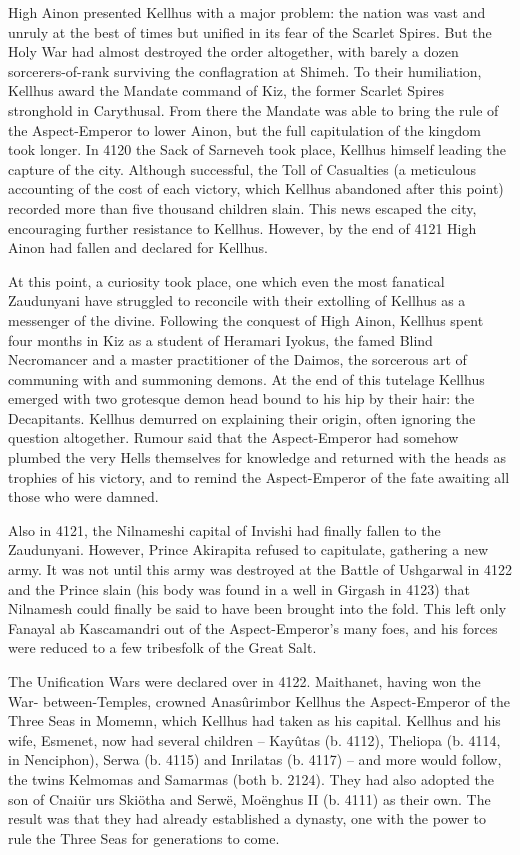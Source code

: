\documentclass[]{book}
\begin{document}
High Ainon presented Kellhus with a major problem: the nation was vast and unruly at
the best of times but unified in its fear of the Scarlet Spires. But the Holy War had
almost destroyed the order altogether, with barely a dozen sorcerers-of-rank surviving
the conflagration at Shimeh. To their humiliation, Kellhus award the Mandate
command of Kiz, the former Scarlet Spires stronghold in Carythusal. From there the
Mandate was able to bring the rule of the Aspect-Emperor to lower Ainon, but the full
capitulation of the kingdom took longer. In 4120 the Sack of Sarneveh took place,
Kellhus himself leading the capture of the city. Although successful, the Toll of
Casualties (a meticulous accounting of the cost of each victory, which Kellhus
abandoned after this point) recorded more than five thousand children slain. This news
escaped the city, encouraging further resistance to Kellhus. However, by the end of
4121 High Ainon had fallen and declared for Kellhus.

At this point, a curiosity took place, one which even the most fanatical Zaudunyani
have struggled to reconcile with their extolling of Kellhus as a messenger of the divine.
Following the conquest of High Ainon, Kellhus spent four months in Kiz as a student
of Heramari Iyokus, the famed Blind Necromancer and a master practitioner of the
Daimos, the sorcerous art of communing with and summoning demons. At the end of
this tutelage Kellhus emerged with two grotesque demon head bound to his hip by
their hair: the Decapitants. Kellhus demurred on explaining their origin, often ignoring
the question altogether. Rumour said that the Aspect-Emperor had somehow plumbed
the very Hells themselves for knowledge and returned with the heads as trophies of his
victory, and to remind the Aspect-Emperor of the fate awaiting all those who were
damned.

Also in 4121, the Nilnameshi capital of Invishi had finally fallen to the Zaudunyani.
However, Prince Akirapita refused to capitulate, gathering a new army. It was not until
this army was destroyed at the Battle of Ushgarwal in 4122 and the Prince slain (his
body was found in a well in Girgash in 4123) that Nilnamesh could finally be said to
have been brought into the fold. This left only Fanayal ab Kascamandri out of the
Aspect-Emperor's many foes, and his forces were reduced to a few tribesfolk of the
Great Salt.

The Unification Wars were declared over in 4122. Maithanet, having won the War-
between-Temples, crowned Anasûrimbor Kellhus the Aspect-Emperor of the Three Seas
in Momemn, which Kellhus had taken as his capital. Kellhus and his wife, Esmenet,
now had several children -- Kayûtas (b. 4112), Theliopa (b. 4114, in Nenciphon), Serwa
(b. 4115) and Inrilatas (b. 4117) -- and more would follow, the twins Kelmomas and
Samarmas (both b. 2124). They had also adopted the son of Cnaiür urs Skiötha and
Serwë, Moënghus II (b. 4111) as their own. The result was that they had already
established a dynasty, one with the power to rule the Three Seas for generations to
come.
\end{document}
